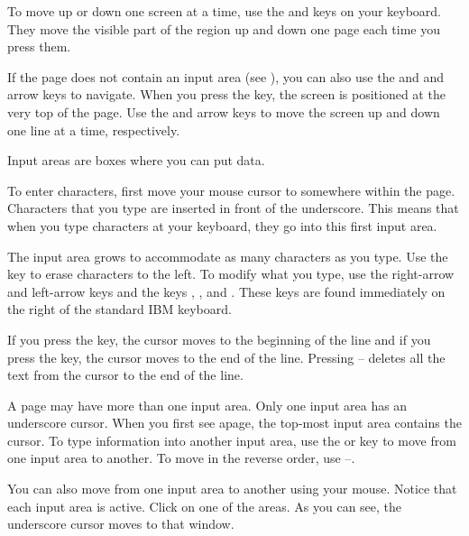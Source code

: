To move up or down one screen at a time, use the
 and
 keys on your keyboard.
They move the visible part of the region up and down one page each time you
press them.

If the \HyperName{} page does not contain an input area
(see ), you can also use the
 and
\fbox{$\uparrow$} and
\fbox{$\downarrow$} arrow keys to navigate.
When you press the  key,
the screen is positioned at the very top of the page.
Use the \fbox{$\uparrow$} and
\fbox{$\downarrow$} arrow keys to move the screen up
and down one line at a time, respectively.

%
Input areas are boxes where you can put data.

To enter characters, first
move your mouse cursor to somewhere within the \HyperName{} page.
Characters that you type are inserted in front of the underscore.
This means that when you type characters at your keyboard, they
go into this first input area.

The input area grows to accommodate as many characters as you type.
Use the 
key to erase characters to the left.
To modify what you type, use the right-arrow \fbox{$\rightarrow$}
and left-arrow keys \fbox{$\leftarrow$} and the
keys ,
,
 and
.
These keys are found immediately on the right of the standard IBM keyboard.

If you press the
key, the cursor moves to the beginning of the line and if you press the
key, the cursor moves to the end of the line.
Pressing
--
deletes all the text from the cursor to the end of the line.

A page may have more than one input area.
Only one input area has an underscore cursor.
When you first see apage, the top-most input area contains the
cursor.
To type information into another input area,
use the  or
 key to move
from one input area to another.
To move in the reverse order, use
--.

You can also move from one input area to another using your mouse.
Notice that each input area is active. Click on one of the areas.
As you can see, the underscore cursor moves to that window.


